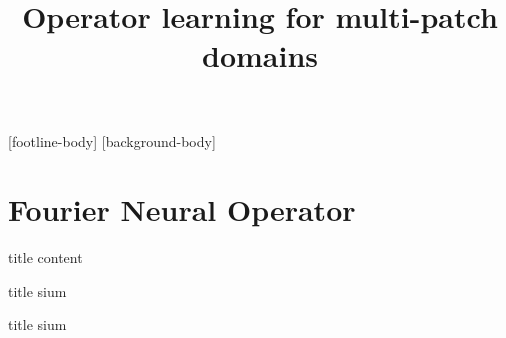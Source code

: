 \documentclass{beamer}
\title{Operator learning for multi-patch domains}
\subtitle{}
\institute{{\inst{1}University of Pavia}}
\begin{document}
\frame{\titlepage}

\addtocounter{framenumber}{-1}
[footline-body]
[background-body]

\section{Fourier Neural Operator}

\begin{frame}{title}
    content

\begin{themedColorBlock}{title}
sium
\end{themedColorBlock}

\begin{themedTitleBlock}{title}
sium
\end{themedTitleBlock}

\end{frame}

\backmatter
\end{document}
